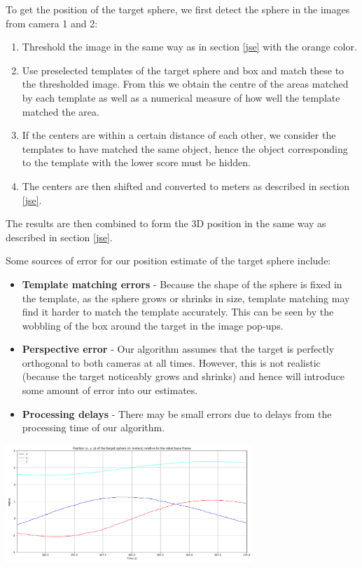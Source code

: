 \documentclass[11pt]{article}
\begin{document}
To get the position of the target sphere, we first detect the sphere in the images from camera 1 and 2:
\begin{enumerate}
	\item Threshold the image in the same way as in section \ref{jse} with the orange color.
	\item Use preselected templates of the target sphere and box and match these to the thresholded image. From this we obtain the centre of the areas matched by each template as well as a numerical measure of how well the template matched the area.
	\item If the centers are within a certain distance of each other, we consider the templates to have matched the same object, hence the object corresponding to the template with the lower score must be hidden.
	\item The centers are then shifted and converted to meters as described in section \ref{jse}.
\end{enumerate}

\noindent The results are then combined to form the 3D position in the same way as described in section \ref{jse}.

\noindent Some sources of error for our position estimate of the target sphere include:
\begin{itemize}
	\item \textbf{Template matching errors} - Because the shape of the sphere is fixed in the template, as the sphere grows or shrinks in size, template matching may find it harder to match the template accurately. This can be seen by the wobbling of the box around the target in the image pop-ups.
	\item \textbf{Perspective error} - Our algorithm assumes that the target is perfectly orthogonal to both cameras at all times. However, this is not realistic (because the target noticeably grows and shrinks) and hence will introduce some amount of error into our estimates.
	\item \textbf{Processing delays} - There may be small errors due to delays from the processing time of our algorithm.
\end{itemize}

\begin{center}
	\includegraphics[width=0.7\textwidth]{target-sphere}
\end{center}
\end{document}
